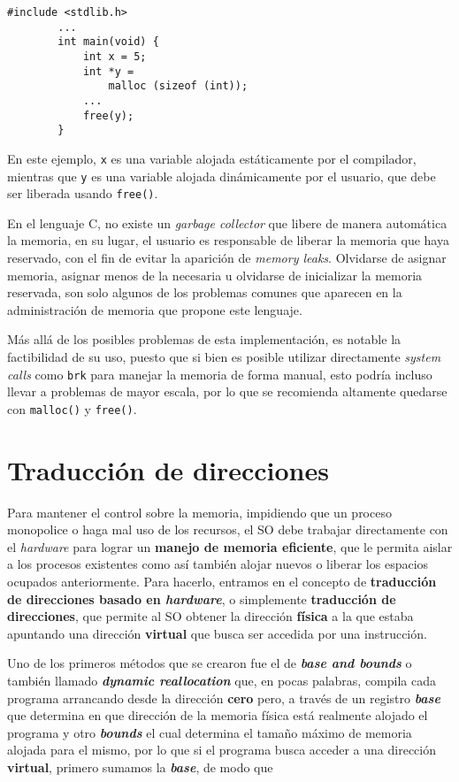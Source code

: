 \documentclass{article}
\begin{document}
	\begin{lstlisting}[caption={Uso de \textit{stack} y \textit{heap} en lenguaje C}]
		#include <stdlib.h>
		...
		int main(void) {
			int x = 5;
			int *y =
				malloc (sizeof (int));
			...
			free(y);
		}
	\end{lstlisting}

	En este ejemplo, \lstinline|x| es una variable alojada estáticamente por el compilador, mientras que \lstinline|y| es una variable alojada dinámicamente por el usuario, que debe ser liberada usando \lstinline|free()|.
	
	En el lenguaje C, no existe un \textit{garbage collector} que libere de manera automática la memoria, en su lugar, el usuario es responsable de liberar la memoria que haya reservado, con el fin de evitar la aparición de \textit{memory leaks}. Olvidarse de asignar memoria, asignar menos de la necesaria u olvidarse de inicializar la memoria reservada, son solo algunos de los problemas comunes que aparecen en la administración de memoria que propone este lenguaje.
	
	Más allá de los posibles problemas de esta implementación, es notable la factibilidad de su uso, puesto que si bien es posible utilizar directamente \textit{system calls} como \lstinline|brk| para manejar la memoria de forma manual, esto podría incluso llevar a problemas de mayor escala, por lo que se recomienda altamente quedarse con \lstinline|malloc()| y \lstinline|free()|.

	\section{Traducción de direcciones}
	Para mantener el control sobre la memoria, impidiendo que un proceso monopolice o haga mal uso de los recursos, el SO debe trabajar directamente con el \textit{hardware} para lograr un \textbf{manejo de memoria eficiente}, que le permita aislar a los procesos existentes como así también alojar nuevos o liberar los espacios ocupados anteriormente. Para hacerlo, entramos en el concepto de \textbf{traducción de direcciones basado en \textit{hardware}}, o simplemente \textbf{traducción de direcciones}, que permite al SO obtener la dirección \textbf{física} a la que estaba apuntando una dirección \textbf{virtual} que busca ser accedida por una instrucción.
	
	Uno de los primeros métodos que se crearon fue el de \textit{\textbf{base and bounds}} o también llamado \textit{\textbf{dynamic reallocation}} que, en pocas palabras, compila cada programa arrancando desde la dirección \textbf{cero} pero, a través de un registro \textit{\textbf{base}} que determina en que dirección de la memoria física está realmente alojado el programa y otro \textit{\textbf{bounds}} el cual determina el tamaño máximo de memoria alojada para el mismo, por lo que si el programa busca acceder a una dirección \textbf{virtual}, primero sumamos la \textit{\textbf{base}}, de modo que
	
\end{document}
